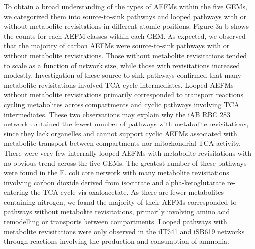 \documentclass[12pt]{article}
\begin{document}
To obtain a broad understanding of the types of AEFMs within the five
GEMs, we categorized them into source-to-sink pathways and looped pathways
with or without metabolite revisitations in different atomic positions.
Figure 3a-b shows the counts for each AEFM classes within each GEM. As
expected, we observed that the majority of carbon AEFMs were
source-to-sink pathways with or without metabolite revisitations. Those
without metabolite revisitations tended to scale as a function of network
size, while those with revisitations increased modestly. Investigation of
these source-to-sink pathways confirmed that many metabolite revisitations
involved TCA cycle intermediates. Looped AEFMs without metabolite
revisitations primarily corresponded to transport reactions cycling
metabolites across compartments and cyclic pathways involving TCA
intermediates. These two observations may explain why the iAB RBC 283
network contained the fewest number of pathways with metabolite
revisitations, since they lack organelles and cannot support cyclic AEFMs
associated with metabolite transport between compartments nor
mitochondrial TCA activity. There were very few internally looped AEFMs
with metabolite revisitations with no obvious trend across the five GEMs.
The greatest number of these pathways were found in the E. coli core
network with many metabolite revisitations involving carbon dioxide
derived from isocitrate and alpha-ketoglutarate re-entering the TCA cycle
via oxaloacetate. As there are fewer metabolites containing nitrogen, we
found the majority of their AEFMs corresponded to pathways without
metabolite revisitations, primarily involving amino acid remodelling or
transports between compartments. Looped pathways with metabolite
revisitations were only observed in the iIT341 and iSB619 networks through
reactions involving the production and consumption of ammonia. 
\end{document}
